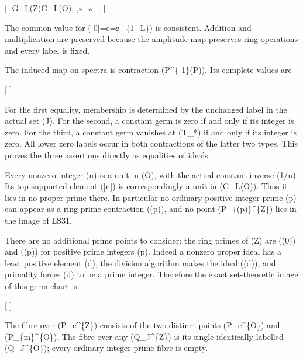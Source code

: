 \documentclass[
]{article}
\begin{document}
{[} \varphi:G\_L(\mathbb Z)\longrightarrow G\_L(\mathcal O),
\qquad [n]\longmapsto[n],\quad z\_\lambda\longmapsto z\_\lambda.
 {]}

The common value for ({[}0{]}=e=z\_\{1\_L\}) is consistent. Addition and
multiplication are preserved because the amplitude map preserves ring
operations and every label is fixed.

The induced map on spectra is contraction
(P\mapsto\varphi\^{}\{-1\}(P)). Its complete values are

{[} 
 {]}

For the first equality, membership is determined by the unchanged label
in the actual set (J). For the second, a constant germ is zero if and
only if its integer is zero. For the third, a constant germ vanishes at
(T\_*) if and only if its integer is zero. All lower zero labels occur
in both contractions of the latter two types. This proves the three
assertions directly as equalities of ideals.

Every nonzero integer (n) is a unit in (\mathcal O), with the actual
constant inverse (1/n). Its top-supported element ({[}n{]}) is
correspondingly a unit in (G\_L(\mathcal O)). Thus it lies in no proper
prime there. In particular no ordinary positive integer prime (p) can
appear as a ring-prime contraction ((p)), and no point
(P\_\{(p)\}\^{}\{\mathbb Z\}) lies in the image of LS31.

There are no additional prime points to consider: the ring primes of
(\mathbb Z) are ((0)) and ((p)) for positive prime integers (p). Indeed
a nonzero proper ideal has a least positive element (d), the division
algorithm makes the ideal ((d)), and primality forces (d) to be a prime
integer. Therefore the exact set-theoretic image of this germ chart is

{[}   {]}

The fibre over (P\_e\^{}\{\mathbb Z\}) consists of the two distinct
points (P\_e\^{}\{\mathcal O\}) and
(P\_\{\mathfrak m\}\^{}\{\mathcal O\}). The fibre over any
(Q\_J\^{}\{\mathbb Z\}) is its single identically labelled
(Q\_J\^{}\{\mathcal O\}); every ordinary integer-prime fibre is empty.
\end{document}
